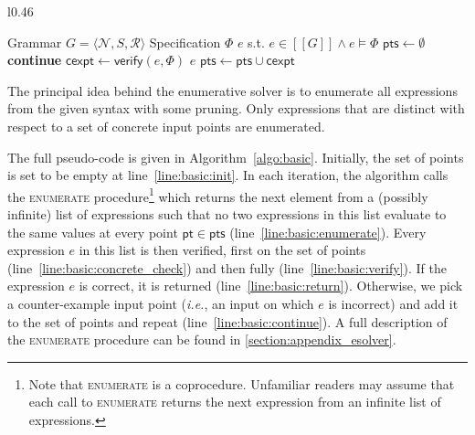 \documentclass{llncs}
\newcommand{\ie}{\emph{i.e.}}
\newcommand\tuple[1]{\langle #1 \rangle}
\newcommand\Points{\mathsf{pts}}
\newcommand\Point{\mathsf{pt}}
\newcommand\Verify{\mathsf{verify}}
\newcommand\CexInput{\mathsf{cexpt}}
\newcommand\Expr{e}
\newcommand\Spec{\Phi}
\newcommand\Grammar{G}
\newcommand\sem[1]{[\![ #1 ]\!]}
\newcommand\NonTerminals{\mathcal{N}}
\newcommand\StartSymbol{S}
\newcommand\Rules{\mathcal{R}}
\begin{document}
\begin{wrapfigure}{l}{0.46\textwidth}
  \begin{minipage}{0.46\textwidth}
    \begin{algorithm}[H]
      \begin{algorithmic}[1]
        \fontsize{8}{10}\selectfont
        \Require Grammar $\Grammar = \tuple { \NonTerminals, \StartSymbol, \Rules }$
        \Require Specification $\Spec$
        \Ensure $\Expr$ s.t.  $\Expr \in \sem{\Grammar} \wedge \Expr \models \Spec$
        \State $\Points \gets \emptyset$ \label{line:basic:init}
        \For {$\Expr \in \Call{enumerate}{\Grammar,\Points}$ }\label{line:basic:enumerate}
        \If { $\Expr \not\models \Spec \downharpoonleft  \Points$ } \textbf{continue} \EndIf\label{line:basic:concrete_check}
        \State $\CexInput \gets \Verify(\Expr, \Spec)$ \label{line:basic:verify}
        \If { $\CexInput = \bot$ } \Return $\Expr$ \EndIf \label{line:basic:return}
        \State $\Points \gets \Points \cup \CexInput$ \label{line:basic:continue}
        \EndFor
        \EndWhile
      \end{algorithmic}
      \caption{Enumerative Solver}
      \label{algo:basic}
    \end{algorithm}
  \end{minipage}
\end{wrapfigure}
The principal idea behind the enumerative solver is to enumerate all
expressions from the given syntax with some pruning.
Only expressions that are distinct with respect to a set of concrete
input points are enumerated.

\noindent
The full pseudo-code is given in Algorithm~\ref{algo:basic}.
Initially, the set of points is set to be empty at
line~\ref{line:basic:init}.  In each iteration, the algorithm calls
the \textsc{enumerate} procedure\footnote{Note that \textsc{enumerate} is
a coprocedure.  Unfamiliar readers may assume that each call to \textsc{enumerate}
returns the next expression from an infinite list of
expressions.} which returns the next element from a (possibly infinite)
list of expressions
such that no two expressions in this list evaluate to the same values
at every point $\Point \in \Points$ (line~\ref{line:basic:enumerate}).
Every expression $\Expr$ in this list is then verified, first on the
set of points (line~\ref{line:basic:concrete_check}) and then fully
(line~\ref{line:basic:verify}).  If the expression $\Expr$ is correct,
it is returned (line~\ref{line:basic:return}).  Otherwise, we pick a
counter-example input point (\ie, an input on which $\Expr$ is
incorrect) and add it to the set of points and repeat
(line~\ref{line:basic:continue}). A full description of the
\textsc{enumerate} procedure can be found in
\ref{section:appendix_esolver}.
\end{document}
